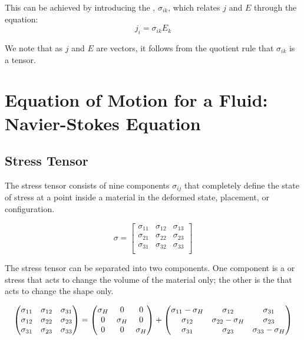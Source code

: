 This can be achieved by introducing the , $\sigma_{ik}$, which relates $j$ and $E$ through the equation:
\[j_i=\sigma_{ik}E_k\]

We note that as $j$ and $E$ are vectors, it follows from the quotient rule that $\sigma_{ik}$ is a tensor.





\section{Equation of Motion for a Fluid: Navier-Stokes Equation}
% 

\subsection{Stress Tensor}
 The stress tensor consists of nine components $\sigma_{ij}$ that completely define the state of stress at a point inside a material in the deformed state, placement, or configuration. 
 

\[\sigma=
\left[{\begin{matrix}
\sigma _{11} & \sigma _{12} & \sigma _{13} \\
\sigma _{21} & \sigma _{22} & \sigma _{23} \\
\sigma _{31} & \sigma _{32} & \sigma _{33} \\
\end{matrix}}\right]
\]



The stress tensor can be separated into two components. One component is a  or  stress that acts to change the volume of the material only; the other is the  that acts to change the shape only.


$$\left( \begin{matrix} {{\sigma _{11}}} & {{\sigma _{12}}} & {{\sigma _{31}}} \cr {{\sigma _{12}}} & {{\sigma _{22}}} & {{\sigma _{23}}} \cr {{\sigma _{31}}} & {{\sigma _{23}}} & {{\sigma _{33}}} \cr \end{matrix} \right) = \left( \begin{matrix} {{\sigma _H}} & 0 & 0 \cr 0 & {{\sigma _H}} & 0 \cr 0 & 0 & {{\sigma _H}} \cr \end{matrix}  \right) + \left( \begin{matrix} {{\sigma _{11}} - {\sigma _H}} & {{\sigma _{12}}} & {{\sigma _{31}}} \cr {{\sigma _{12}}} & {{\sigma _{22}} - {\sigma _H}} & {{\sigma _{23}}} \cr {{\sigma _{31}}} & {{\sigma _{23}}} & {{\sigma _{33}} - {\sigma _H}} \cr \end{matrix}   \right)$$

